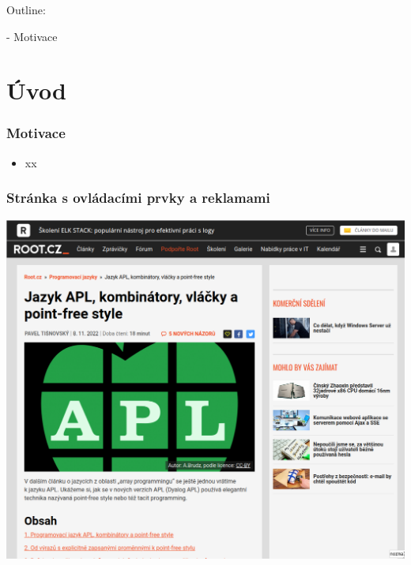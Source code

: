 
Outline:

- Motivace
\section{Úvod}

\begin{frame}
  \frametitle{Motivace}
  \begin{itemize}
    \item xx
  \end{itemize}
\end{frame}
\begin{frame}
  \frametitle{Stránka s ovládacími prvky a reklamami}
  \begin{center}
    \includegraphics[height=.9\textheight]{img/root-balast.png}
  \end{center}
\end{frame}

